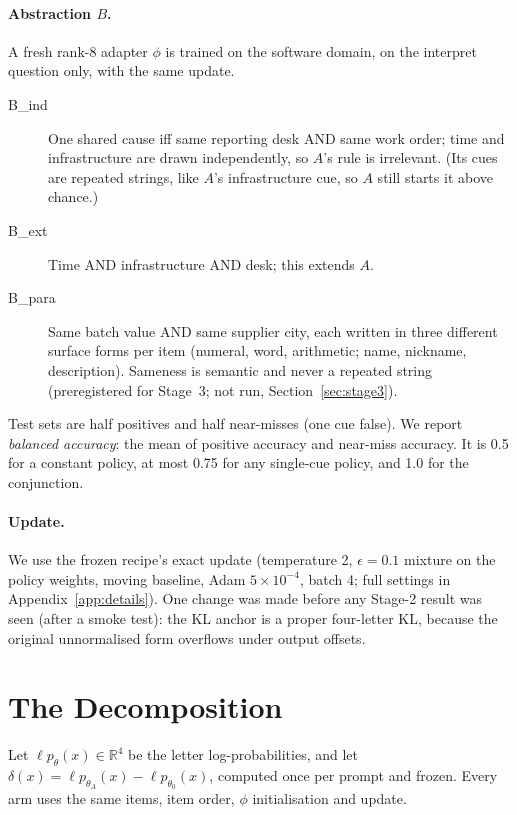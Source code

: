 \documentclass[11pt]{article}
\begin{document}
\paragraph{Abstraction $B$.} A fresh rank-8 adapter $\phi$ is trained on the software domain, on the interpret question only, with the same update.

\begin{description}
\item[B\_ind] One shared cause iff same reporting desk AND same work order; time and infrastructure are drawn independently, so $A$'s rule is irrelevant. (Its cues are repeated strings, like $A$'s infrastructure cue, so $A$ still starts it above chance.)
\item[B\_ext] Time AND infrastructure AND desk; this extends $A$.
\item[B\_para] Same batch value AND same supplier city, each written in three different surface forms per item (numeral, word, arithmetic; name, nickname, description). Sameness is semantic and never a repeated string (preregistered for Stage~3; not run, Section~\ref{sec:stage3}).
\end{description}

Test sets are half positives and half near-misses (one cue false). We report \emph{balanced accuracy}: the mean of positive accuracy and near-miss accuracy. It is 0.5 for a constant policy, at most 0.75 for any single-cue policy, and 1.0 for the conjunction.

\paragraph{Update.} We use the frozen recipe's exact update (temperature 2, $\epsilon=0.1$ mixture on the policy weights, moving baseline, Adam $5\times10^{-4}$, batch 4; full settings in Appendix~\ref{app:details}). One change was made before any Stage-2 result was seen (after a smoke test): the KL anchor is a proper four-letter KL, because the original unnormalised form overflows under output offsets.

\section{The Decomposition}\label{sec:method}

Let $\ell p_\theta(x)\in\mathbb{R}^4$ be the letter log-probabilities, and let $\delta(x)=\ell p_{\theta_A}(x)-\ell p_{\theta_0}(x)$, computed once per prompt and frozen. Every arm uses the same items, item order, $\phi$ initialisation and update.
\end{document}
